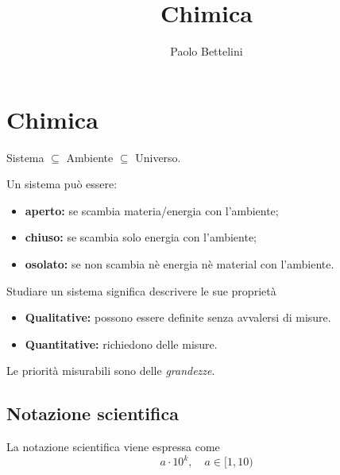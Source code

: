 \documentclass[a4paper]{article}
\title{Chimica}
\author{Paolo Bettelini}
\date{}
\begin{document}
\maketitle
\tableofcontents


\pagebreak

\section{Chimica}



Sistema \(\subseteq\) Ambiente \(\subseteq\) Universo.

Un sistema può essere:
\begin{itemize}
    \item \textbf{aperto:} se scambia materia/energia con l'ambiente;
    \item \textbf{chiuso:} se scambia solo energia con l'ambiente;
    \item \textbf{osolato:} se non scambia nè energia nè material con l'ambiente.
\end{itemize}

Studiare un sistema significa descrivere le sue proprietà
\begin{itemize}
    \item \textbf{Qualitative:} possono essere definite senza avvalersi
    di misure.
    \item \textbf{Quantitative:} richiedono delle misure.
\end{itemize}
Le priorità misurabili sono delle \textit{grandezze}.


\subsection{Notazione scientifica}

La notazione scientifica viene espressa come
\[
    a \cdot 10^k,\quad a\in [1, 10)
\]

\pagebreak
\end{document}
